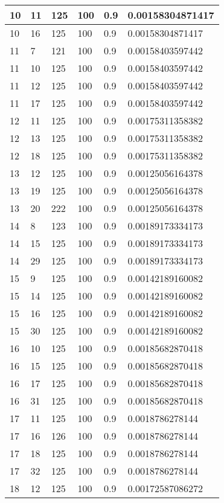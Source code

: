 \begin{longtable}{|l|l|l|l|l|l|}
10 & 11 & 125 & 100 & 0.9 & 0.00158304871417 \\ \hline
10 & 16 & 125 & 100 & 0.9 & 0.00158304871417 \\ \hline
11 & 7  & 121 & 100 & 0.9 & 0.00158403597442 \\ \hline
11 & 10 & 125 & 100 & 0.9 & 0.00158403597442 \\ \hline
11 & 12 & 125 & 100 & 0.9 & 0.00158403597442 \\ \hline
11 & 17 & 125 & 100 & 0.9 & 0.00158403597442 \\ \hline
12 & 11 & 125 & 100 & 0.9 & 0.00175311358382 \\ \hline
12 & 13 & 125 & 100 & 0.9 & 0.00175311358382 \\ \hline
12 & 18 & 125 & 100 & 0.9 & 0.00175311358382 \\ \hline
13 & 12 & 125 & 100 & 0.9 & 0.00125056164378 \\ \hline
13 & 19 & 125 & 100 & 0.9 & 0.00125056164378 \\ \hline
13 & 20 & 222 & 100 & 0.9 & 0.00125056164378 \\ \hline
14 & 8  & 123 & 100 & 0.9 & 0.00189173334173 \\ \hline
14 & 15 & 125 & 100 & 0.9 & 0.00189173334173 \\ \hline
14 & 29 & 125 & 100 & 0.9 & 0.00189173334173 \\ \hline
15 & 9  & 125 & 100 & 0.9 & 0.00142189160082 \\ \hline
15 & 14 & 125 & 100 & 0.9 & 0.00142189160082 \\ \hline
15 & 16 & 125 & 100 & 0.9 & 0.00142189160082 \\ \hline
15 & 30 & 125 & 100 & 0.9 & 0.00142189160082 \\ \hline
16 & 10 & 125 & 100 & 0.9 & 0.00185682870418 \\ \hline
16 & 15 & 125 & 100 & 0.9 & 0.00185682870418 \\ \hline
16 & 17 & 125 & 100 & 0.9 & 0.00185682870418 \\ \hline
16 & 31 & 125 & 100 & 0.9 & 0.00185682870418 \\ \hline
17 & 11 & 125 & 100 & 0.9 & 0.0018786278144  \\ \hline
17 & 16 & 126 & 100 & 0.9 & 0.0018786278144  \\ \hline
17 & 18 & 125 & 100 & 0.9 & 0.0018786278144  \\ \hline
17 & 32 & 125 & 100 & 0.9 & 0.0018786278144  \\ \hline
18 & 12 & 125 & 100 & 0.9 & 0.00172587086272 \\ \hline

\end{longtable}
